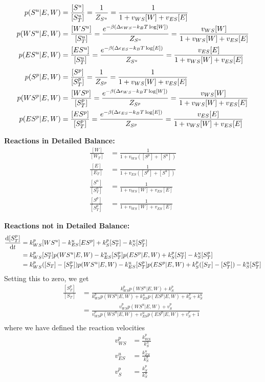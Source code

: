 \documentclass[aps,onecolumn,superscriptaddress,notitlepage]{revtex4-1}
\begin{document}
\begin{align}
p(S^u|E, W) &= \frac{[S^u]}{[S^u_T]} = \frac{1}{Z_{S^u}} = \frac{1}{1 + v_{WS}[W]+ v_{ES}[E]}\\
p(WS^u|E, W) &= \frac{[WS^u]}{[S^u_T]} = \frac{ e^{-\beta\qty(\Delta\epsilon_{WS} -k_BT \log[W])}}{Z_{S^u}} = \frac{v_{WS}[W]}{1 + v_{WS}[W]+ v_{ES}[E]}\\
p(ES^u|E, W) &= \frac{[ES^u]}{[S^u_T]} = \frac{ e^{-\beta\qty(\Delta\epsilon_{ES} -k_BT \log[E])}}{Z_{S^u}} = \frac{v_{ES}[E]}{1 + v_{WS}[W]+ v_{ES}[E]}
\end{align}
\begin{align}
p(S^p|E, W) &= \frac{[S^p]}{[S^p_T]} = \frac{1}{Z_{S^p}} = \frac{1}{1 + v_{WS}[W]+ v_{ES}[E]}\\
p(WS^p|E, W) &= \frac{[WS^p]}{[S^p_T]} = \frac{ e^{-\beta\qty(\Delta\epsilon_{WS} -k_BT \log[W])}}{Z_{S^p}} = \frac{v_{WS}[W]}{1 + v_{WS}[W]+ v_{ES}[E]}\\
p(ES^p|E, W) &= \frac{[ES^p]}{[S^p_T]} = \frac{ e^{-\beta\qty(\Delta\epsilon_{ES} -k_BT \log[E])}}{Z_{S^p}} = \frac{v_{ES}[E]}{1 + v_{WS}[W]+ v_{ES}[E]}
\end{align}

\textbf{Reactions in Detailed Balance:}
\begin{align}
\frac{[W]}{[W_T]} & = \frac{1}{1 + v_{WS}([S^p]+[S^u])}\\
\frac{[E]}{[E_T]} & = \frac{1}{1 + v_{ES}([S^p]+[S^u])}\\
\frac{[S^u]}{[S^u_T]} &= \frac{1}{1 + v_{WS}[W]+ v_{ES}[E]}\\
\frac{[S^p]}{[S^p_T]} &=  \frac{1}{1+ v_{WS}[W] + v_{ES}[E]}
\end{align}

\textbf{Reactions not in  Detailed Balance:}
\begin{align}
\dv{[S^p_T]}{t} &= k_{WS}^p[WS^u] - k_{ES}^u[ES^p] + k_S^p[S^u_T] - k_S^u[S^p_T] \\
&= k_{WS}^p[S^u_T]p(WS^u|E, W) - k_{ES}^u[S^p_T]p(ES^p|E, W) + k_S^p[S^u_T] - k_S^u[S^p_T]\\
&= k_{WS}^p([S_T]-[S^p_T])p(WS^u|E, W) - k_{ES}^u[S^p_T]p(ES^p|E, W) + k_S^p([S_T]-[S^p_T]) - k_S^u[S^p_T]
\end{align}
Setting this to zero, we get
\begin{align}
\frac{[S_T^p]}{[S_T]} &= \frac{k_{WS}^p p(WS^u|E,W) + k_S^p}{k_{WS}^p p(WS^u|E,W) + k_{ES}^u p(ES^p|E,W) + k_S^p + k_S^u}\\
 &= \frac{v_{WS}^p p(WS^u|E,W) + v_S^p}{v_{WS}^p p(WS^u|E,W) + v_{ES}^u p(ES^p|E,W) + v_S^p + 1}\\
\end{align}
where we have defined the reaction velocities
\begin{align}
v_{WS}^p &= \frac{k_{WS}^p}{k_S^u}\\
v_{ES}^u &= \frac{k_{ES}^u}{k_S^u}\\
v_S^p &= \frac{k_S^p}{k_S^u}
\end{align}
\end{document}
